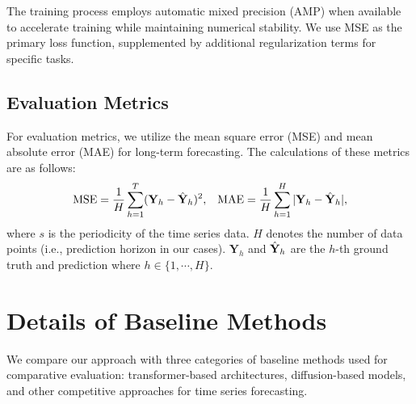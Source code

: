 The training process employs automatic mixed precision (AMP) when available to accelerate training while maintaining numerical stability. We use MSE as the primary loss function, supplemented by additional regularization terms for specific tasks.

\subsection{Evaluation Metrics}
\label{appx:metric}
For evaluation metrics, we utilize the mean square error (MSE) and mean absolute error (MAE) for long-term forecasting. 
The calculations of these metrics are as follows:
\begin{align*} \label{equ:metrics}
    \text{MSE} &= \frac{1}{H}\sum_{h=1}^T (\mathbf{Y}_{h} - \Hat{\mathbf{Y}}_{h})^2,
    &
    \text{MAE} &= \frac{1}{H}\sum_{h=1}^H|\mathbf{Y}_{h} - \Hat{\mathbf{Y}}_{h}|,\\
\end{align*}
where $s$ is the periodicity of the time series data. $H$ denotes the number of data points (i.e., prediction horizon in our cases). $\mathbf{Y}_{h}$ and $\Hat{\mathbf{Y}}_{h}$ are the $h$-th ground truth and prediction where $h \in \{1, \cdots, H\}$.

\section{Details of Baseline Methods}
\label{appx:baselines}
We compare our approach with three categories of baseline methods used for comparative evaluation: transformer-based architectures, diffusion-based models, and other competitive approaches for time series forecasting.
